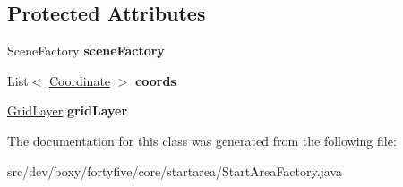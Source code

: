 \subsection*{Protected Attributes}
\begin{DoxyCompactItemize}
\item 
\hypertarget{classdev_1_1boxy_1_1fortyfive_1_1core_1_1startarea_1_1_start_area_factory_ac2a698143a7e9d6dad3410b354973e26}{
SceneFactory {\bfseries sceneFactory}}
\label{d4/d95/classdev_1_1boxy_1_1fortyfive_1_1core_1_1startarea_1_1_start_area_factory_ac2a698143a7e9d6dad3410b354973e26}

\item 
\hypertarget{classdev_1_1boxy_1_1fortyfive_1_1core_1_1startarea_1_1_start_area_factory_a1f953e1e579bf3dfa06f674be75a21fa}{
List$<$ \hyperlink{classdev_1_1boxy_1_1fortyfive_1_1core_1_1startarea_1_1_coordinate}{Coordinate} $>$ {\bfseries coords}}
\label{d4/d95/classdev_1_1boxy_1_1fortyfive_1_1core_1_1startarea_1_1_start_area_factory_a1f953e1e579bf3dfa06f674be75a21fa}

\item 
\hypertarget{classdev_1_1boxy_1_1fortyfive_1_1core_1_1startarea_1_1_start_area_factory_a3d24e3b3dcaf95176a6049b6e4a54307}{
\hyperlink{classdev_1_1boxy_1_1fortyfive_1_1_grid_layer}{GridLayer} {\bfseries gridLayer}}
\label{d4/d95/classdev_1_1boxy_1_1fortyfive_1_1core_1_1startarea_1_1_start_area_factory_a3d24e3b3dcaf95176a6049b6e4a54307}

\end{DoxyCompactItemize}


The documentation for this class was generated from the following file:\begin{DoxyCompactItemize}
\item 
src/dev/boxy/fortyfive/core/startarea/StartAreaFactory.java\end{DoxyCompactItemize}
